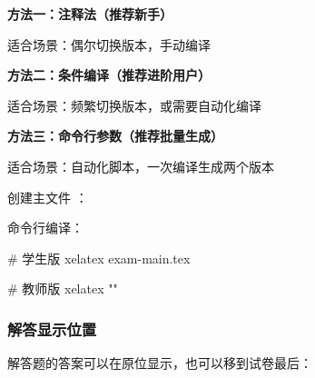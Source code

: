 \begin{tcolorbox}[colback=green!5!white, colframe=green!75!black, title=\textbf{最佳实践：版本切换方法对比}]
\textbf{方法一：注释法（推荐新手）}

适合场景：偶尔切换版本，手动编译

\begin{latexcode}
\end{latexcode}

\textbf{方法二：条件编译（推荐进阶用户）}

适合场景：频繁切换版本，或需要自动化编译

\begin{latexcode}
\newif\ifteacher
\teachertrue   %

\ifteacher
\fi
\end{latexcode}

\textbf{方法三：命令行参数（推荐批量生成）}

适合场景：自动化脚本，一次编译生成两个版本

创建主文件 ：
\begin{latexcode}
\ifdefined\SHOWANSWER
\fi
\end{latexcode}

命令行编译：
\begin{shellcode}
# 学生版
xelatex exam-main.tex

# 教师版
xelatex "\def\SHOWANSWER{1}"
\end{shellcode}
\end{tcolorbox}

\subsubsection{解答显示位置}

解答题的答案可以在原位显示，也可以移到试卷最后：

\begin{latexcode}
\end{latexcode}

